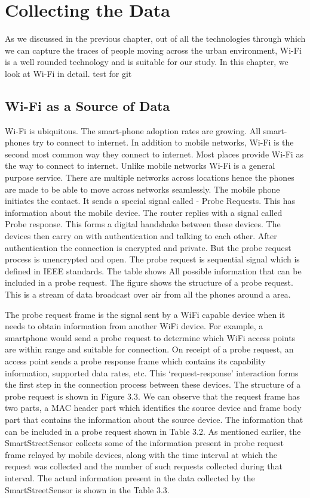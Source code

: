 \chapter{Collecting the Data}

As we discussed in the previous chapter, out of all the technologies through
which we can capture the traces of people moving across the urban environment,
Wi-Fi is a well rounded technology and is suitable for our study. In this
chapter, we look at Wi-Fi in detail. test for git

\section{Wi-Fi as a Source of Data}

Wi-Fi is ubiquitous.
The smart-phone adoption rates are growing.
All smart-phones try to connect to internet.
In addition to mobile networks, Wi-Fi is the second most common way they connect to internet.
Most places provide Wi-Fi as the way to connect to internet.
Unlike mobile networks Wi-Fi is a general purpose service.
There are multiple networks across locations hence the phones are made to be able to move across networks seamlessly.
The mobile phone initiates the contact.
It sends a special signal called - Probe Requests.
This has information about the mobile device.
The router replies with a signal called Probe response.
This forms a digital handshake between these devices.
The devices then carry on with authentication and talking to each other.
After authentication the connection is encrypted and private.
But the probe request process is unencrypted and open.
The probe request is sequential signal which is defined in IEEE standards.
The table shows All possible information that can be included in a probe request.
The figure shows the structure of a probe request.
This is a stream of data broadcast over air from all the phones around a area. 

The probe request frame is the signal sent by a WiFi capable device when it needs to obtain information from another WiFi device.
For example, a smartphone would send a probe request to determine which WiFi access points are within range and suitable for connection.
On receipt of a probe request, an access point sends a probe response frame which contains its capability information, supported data rates, etc.
This ‘request-response’ interaction forms the first step in the connection process between these devices.
The structure of a probe request is shown in Figure 3.3.
We can observe that the request frame has two parts, a MAC header part which identifies the source device and frame body part that contains the information about the source device.
The information that can be included in a probe request shown in Table 3.2.
As mentioned earlier, the SmartStreetSensor collects some of the information present in probe request frame relayed by mobile devices, along with the time interval at which the request was collected and the number of such requests collected during that interval.
The actual information present in the data collected by the SmartStreetSensor is shown in the Table 3.3.

